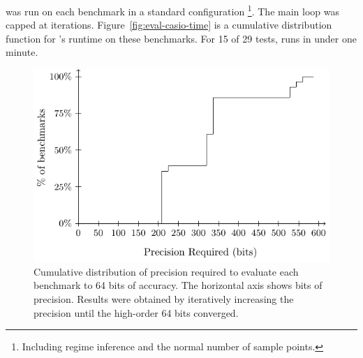 \documentclass[paper.tex]{subfiles}
\begin{document}
\casio was run on each benchmark in a standard configuration%
\footnote{Including regime inference and the normal number of sample
  points.}.  The main loop was capped at \nIters iterations.
Figure~\ref{fig:eval-casio-time} is a cumulative distribution function for
\casio's runtime on these benchmarks.  For 15 of 29 tests, \casio runs
in under one minute.

\begin{figure}
\includegraphics[width=0.9\columnwidth]{fig/eval-mpfr-bits.pdf}
\caption{Cumulative distribution of precision required to evaluate
  each benchmark to 64 bits of accuracy. The horizontal axis shows
  bits of precision. Results were obtained by iteratively increasing
  the precision until the high-order 64 bits converged.}
\label{fig:eval-mpfr-bits}
\end{figure}
\end{document}
